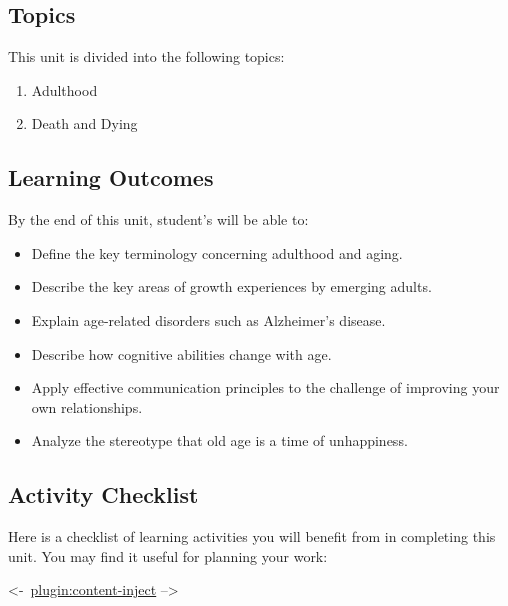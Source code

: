 \documentclass[
]{book}
\providecommand{\tightlist}{%
  \setlength{\itemsep}{0pt}\setlength{\parskip}{0pt}}
\begin{document}
\hypertarget{topics-1}{%
\subsection*{Topics}\label{topics-1}}

This unit is divided into the following topics:

\begin{enumerate}
\def\labelenumi{\arabic{enumi}.}
\tightlist
\item
  Adulthood
\item
  Death and Dying
\end{enumerate}

\hypertarget{learning-outcomes-1}{%
\subsection*{Learning Outcomes}\label{learning-outcomes-1}}

By the end of this unit, student's will be able to:

\begin{itemize}
\tightlist
\item
  Define the key terminology concerning adulthood and aging.
\item
  Describe the key areas of growth experiences by emerging adults.
\item
  Explain age-related disorders such as Alzheimer's disease.
\item
  Describe how cognitive abilities change with age.
\item
  Apply effective communication principles to the challenge of improving your own relationships.
\item
  Analyze the stereotype that old age is a time of unhappiness.
\end{itemize}

\hypertarget{activity-checklist-1}{%
\subsection*{Activity Checklist}\label{activity-checklist-1}}

Here is a checklist of learning activities you will benefit from in completing this unit. You may find it useful for planning your work:

\textless-~\href{_schedule}{plugin:content-inject} --\textgreater{}
\end{document}
